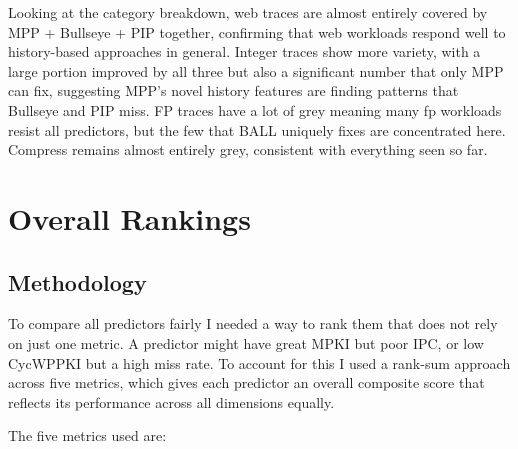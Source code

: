 \documentclass[11pt,a4paper]{article}
\begin{document}
Looking at the category breakdown, web traces are almost entirely covered by 
MPP + Bullseye + PIP together, confirming that web workloads respond well to 
history-based approaches in general. Integer traces show more variety, with a 
large portion improved by all three but also a significant number that only MPP 
can fix, suggesting MPP's novel history features are finding patterns that 
Bullseye and PIP miss. FP traces have a lot of grey meaning many fp workloads 
resist all predictors, but the few that BALL uniquely fixes are concentrated 
here. Compress remains almost entirely grey, consistent with everything seen 
so far.

\section{Overall Rankings}

\subsection{Methodology}

To compare all predictors fairly I needed a way to rank them that does not 
rely on just one metric. A predictor might have great MPKI but poor IPC, or 
low CycWPPKI but a high miss rate. To account for this I used a rank-sum 
approach across five metrics, which gives each predictor an overall composite 
score that reflects its performance across all dimensions equally.

The five metrics used are:
\end{document}
